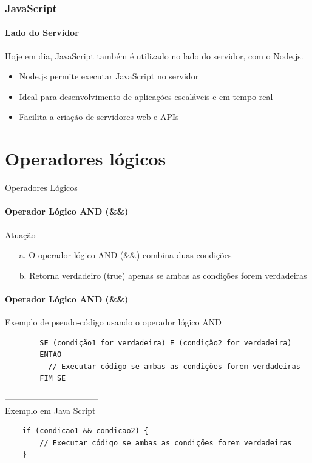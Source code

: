 \documentclass[13pt, xcolor={dvipsnames,svgnames}, portuguese]{beamer}
\begin{document}
\begin{frame}
\frametitle{JavaScript}
\framesubtitle{Lado do Servidor}

Hoje em dia, JavaScript também é utilizado no lado do servidor, com o Node.js.

\begin{itemize}
  \item Node.js permite executar JavaScript no servidor
  \item Ideal para desenvolvimento de aplicações escaláveis e em tempo real
  \item Facilita a criação de servidores web e APIs
\end{itemize}

\end{frame}
\section{Operadores lógicos}

\begin{frame}{Operadores Lógicos}
\framesubtitle{Operador Lógico AND (\&\&)}
	\begin{block}{Atuação}
		\begin{itemize}
		  \item[a. ] O operador lógico AND (\&\&) combina duas condições 
		  \pause
		  \item[b. ] Retorna verdadeiro (true) apenas se ambas as condições forem verdadeiras
		\end{itemize}
	\end{block}	
\end{frame}


\begin{frame}[fragile]
\framesubtitle{Operador Lógico AND (\&\&)}
 Exemplo de pseudo-código usando o operador lógico AND

	\begin{verbatim}
		SE (condição1 for verdadeira) E (condição2 for verdadeira)
		ENTAO
		  // Executar código se ambas as condições forem verdadeiras
		FIM SE
	\end{verbatim}
	---------------------------------\\
	Exemplo em Java Script
	\begin{verbatim}
	if (condicao1 && condicao2) {
  		// Executar código se ambas as condições forem verdadeiras
	}

	\end{verbatim}
\end{frame}
\end{document}
